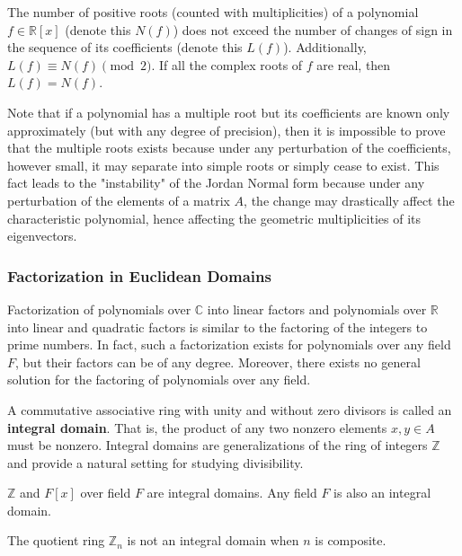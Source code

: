     \begin{theorem}
      The number of positive roots (counted with multiplicities) of a polynomial $f \in \mathbb{R}[x]$ (denote this $N(f)$) does not exceed the number of changes of sign in the sequence of its coefficients (denote this $L(f)$). Additionally, $L(f) \equiv N(f) \pmod{2}$. If all the complex roots of $f$ are real, then $L(f) = N(f)$. 
    \end{theorem}

    Note that if a polynomial has a multiple root but its coefficients are known only approximately (but with any degree of precision), then it is impossible to prove that the multiple roots exists because under any perturbation of the coefficients, however small, it may separate into simple roots or simply cease to exist. This fact leads to the "instability" of the Jordan Normal form because under any perturbation of the elements of a matrix $A$, the change may drastically affect the characteristic polynomial, hence affecting the geometric multiplicities of its eigenvectors. 

  \subsubsection{Factorization in Euclidean Domains}

    Factorization of polynomials over $\mathbb{C}$ into linear factors and polynomials over $\mathbb{R}$ into linear and quadratic factors is similar to the factoring of the integers to prime numbers. In fact, such a factorization exists for polynomials over any field $F$, but their factors can be of any degree. Moreover, there exists no general solution for the factoring of polynomials over any field. 

    \begin{definition}
      A commutative associative ring with unity and without zero divisors is called an \textbf{integral domain}. That is, the product of any two nonzero elements $x, y \in A$ must be nonzero. Integral domains are generalizations of the ring of integers $\mathbb{Z}$ and provide a natural setting for studying divisibility. 
    \end{definition}

    \begin{example}
      $\mathbb{Z}$ and $F[x]$ over field $F$ are integral domains. Any field $F$ is also an integral domain. 
    \end{example}

    \begin{example}
      The quotient ring $\mathbb{Z}_n$ is not an integral domain when $n$ is composite. 
    \end{example}

